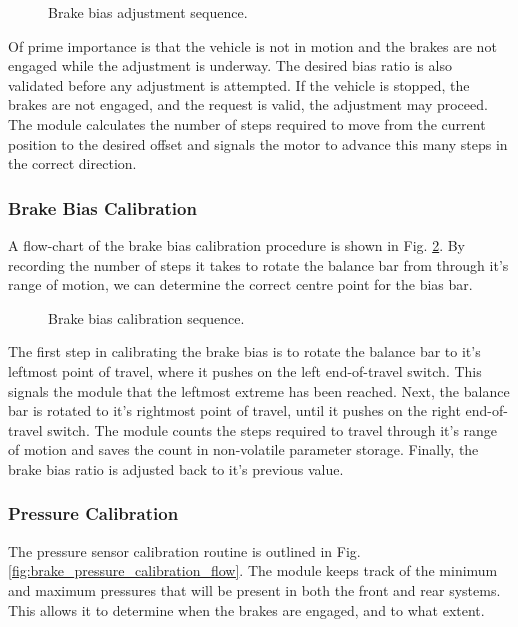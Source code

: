 \begin{figure}[H]
	\centering
	
	\caption{Brake bias adjustment sequence.}
	\label{fig:design-braking-bias-adjustment}
\end{figure}

Of prime importance is that the vehicle is not in motion and the brakes are not engaged while the adjustment is underway. The desired bias ratio is also validated before any adjustment is attempted. If the vehicle is stopped, the brakes are not engaged, and the request is valid, the adjustment may proceed. The module calculates the number of steps required to move from the current position to the desired offset and signals the motor to advance this many steps in the correct direction.

\subsubsection{Brake Bias Calibration}

A flow-chart of the brake bias calibration procedure is shown in Fig. \ref{fig:brake_bias_calibration_flow}. By recording the number of steps it takes to rotate the balance bar from through it's range of motion, we can determine the correct centre point for the bias bar. 

\begin{figure}[H]
	\centering
	
	\caption{Brake bias calibration sequence.}
	\label{fig:brake_bias_calibration_flow}
\end{figure}

The first step in calibrating the brake bias is to rotate the balance bar to it's leftmost point of travel, where it pushes on the left end-of-travel switch. This signals the module that the leftmost extreme has been reached. Next, the balance bar is rotated to it's rightmost point of travel, until it pushes on the right end-of-travel switch. The module counts the steps required to travel through it's range of motion and saves the count in non-volatile parameter storage. Finally, the brake bias ratio is adjusted back to it's previous value.

\subsubsection{Pressure Calibration}

The pressure sensor calibration routine is outlined in Fig. \ref{fig:brake_pressure_calibration_flow}. The module keeps track of the minimum and maximum pressures that will be present in both the front and rear systems. This allows it to determine when the brakes are engaged, and to what extent.

